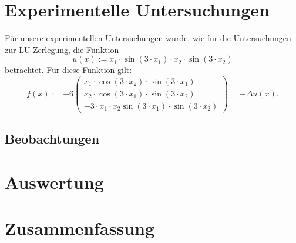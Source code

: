 \documentclass{scrartcl}
\theoremstyle{definition}
\begin{document}
\section{Experimentelle Untersuchungen}
Für unsere experimentellen Untersuchungen wurde, wie für die Untersuchungen zur LU-Zerlegung, die Funktion
\begin{equation*}
u(x) := x_1 \cdot \sin(3 \cdot x_1) \cdot x_2 \cdot \sin(3 \cdot x_2)
\end{equation*}
betrachtet. Für diese Funktion gilt:
\begin{equation*}
f(x) := -6 \begin{pmatrix}
x_1 \cdot \cos(3 \cdot x_2) \cdot \sin(3 \cdot x_1) \\ 
x_2 \cdot \cos(3 \cdot x_1) \cdot \sin(3 \cdot x_2) \\ 
-3 \cdot x_1 \cdot x_2 \sin(3 \cdot x_1) \cdot \sin(3 \cdot x_2)
\end{pmatrix}
= -\Delta u(x).
\end{equation*}










\subsection{Beobachtungen}



\section{Auswertung}



\section{Zusammenfassung}


\printbibliography%
\end{document}
